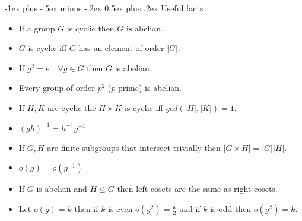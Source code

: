 \documentclass[10pt,landscape]{article}
\makeatletter
\renewcommand{\section}{\@startsection{section}{1}{0mm}%
                                {-1ex plus -.5ex minus -.2ex}%
                                {0.5ex plus .2ex}%
                                {\normalfont\large\bfseries}}
\makeatother
\begin{document}
\begin{multicols}{3}
\vfill\null
\columnbreak

\section{Useful facts}
\begin{itemize}
	\item If a group $G$ is cyclic then $G$ is abelian.
	\item $G$ is cyclic iff $G$ has an element of order $|G|$.
	\item If $g^2 = e \quad \forall g \in G$ then $G$ is abelian.
	\item Every group of order $p^2$ ($p$ prime) is abelian.
	\item If $H,K$ are cyclic the $H \times K$ is cyclic iff $gcd(|H|,|K|)=1$.
	\item $(gh)^{-1} = h^{-1}g^{-1}$
	\item If $G,H$ are finite subgroups that intersect trivially then $|G \times H| = |G||H|$.
	\item $o(g) = o(g^{-1})$
	\item If $G$ is abelian and $H \leq G$ then left cosets are the same as right cosets.
	\item Let $o(g) = k$ then if $k$ is even $o(g^2) = \frac{k}{2}$ and if $k$ is odd then $o(g^2) = k$.
\end{itemize}

\end{multicols}
\end{document}
